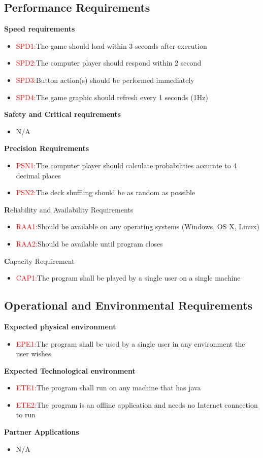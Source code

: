 \documentclass[12pt]{article}
\begin{document}
	\subsection{Performance Requirements}
	\textbf{Speed requirements}
	\begin{itemize}
	\item 	\textcolor{red}{SPD1:}The game should load within 3 seconds after execution
	\item 	\textcolor{red}{SPD2:}The computer player should respond within 2 second
	\item 	\textcolor{red}{SPD3:}Button action(s) should be performed immediately
	\item 	\textcolor{red}{SPD4:}The game graphic should refresh every 1 seconds (1Hz)
	\end{itemize}	
	\textbf{Safety and Critical requirements}
	\begin{itemize}
	\item N/A
	\end{itemize}
	\textbf{Precision Requirements}
	\begin{itemize}
	\item	\textcolor{red}{PSN1:}The computer player should calculate probabilities accurate to 4 decimal places
	\item	\textcolor{red}{PSN2:}The deck shuffling should be as random as possible
	\end{itemize}
	\textbf	Reliability and Availability Requirements
	\begin{itemize}
	\item 	\textcolor{red}{RAA1:}Should be available on any operating systems (Windows, OS X, Linux)
	\item 	\textcolor{red}{RAA2:}Should be available until program closes
	\end{itemize}
	\textbf Capacity Requirement 
	\begin{itemize}
	\item 	\textcolor{red}{CAP1:}The program shall be played by a single user on a single machine
	\end{itemize}
	
	\subsection{Operational and Environmental Requirements}
	\textbf{Expected physical environment}
	\begin{itemize}
	\item	\textcolor{red}{EPE1:}The program shall be used by a single user in any environment the user wishes
	\end{itemize}
	\textbf{Expected Technological environment}
	\begin{itemize}
	\item	\textcolor{red}{ETE1:}The program shall run on any machine that has java
 	\item	\textcolor{red}{ETE2:}The program is an offline application and needs no Internet connection to run
	\end{itemize}	
	\textbf{Partner Applications}
	\begin{itemize}
	\item N/A
	\end{itemize}
\end{document}
